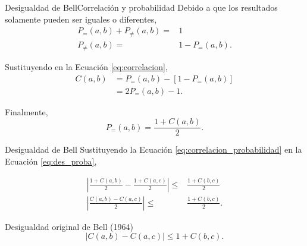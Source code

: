 \begin{frame}{Desigualdad de Bell}{Correlación y probabilidad}
Debido a que los resultados solamente pueden ser iguales o diferentes,
\begin{align*}
	P_{=}(a,b)+P_{\neq}(a,b)=&1	\\
	P_{\neq}(a,b)=&1-P_{=}(a,b).
\end{align*}

Sustituyendo en la Ecuación \ref{eq:correlacion},
\begin{align*}
	C(a,b)&=P_{=}(a,b)-[1-P_{=}(a,b)]\\
	&=2P_{=}(a,b)-1.
\end{align*}

Finalmente,
\begin{equation}
	P_{=}(a,b)=\frac{1+C(a,b)}{2}.
	\label{eq:correlacion_probabilidad}
\end{equation}
\end{frame}


\begin{frame}{Desigualdad de Bell}{}
Sustituyendo la Ecuación \ref{eq:correlacion_probabilidad} en la Ecuación \ref{eq:des_proba},

\begin{align*}
	\left|\frac{1+C(a,b)}{2}-\frac{1+C(a,c)}{2}\right|\leq&\frac{1+C(b,c)}{2}
	\\
	\left|\frac{C(a,b)-C(a,c)}{2}\right|\leq&\frac{1+C(b,c)}{2}.
\end{align*}

\begin{block}{Desigualdad original de Bell (1964)}
\begin{equation}
|C(a,b)-C(a,c)|\leq 1+C(b,c).
	\label{eq:des_bell}
	\end{equation}
\end{block}
\end{frame}


